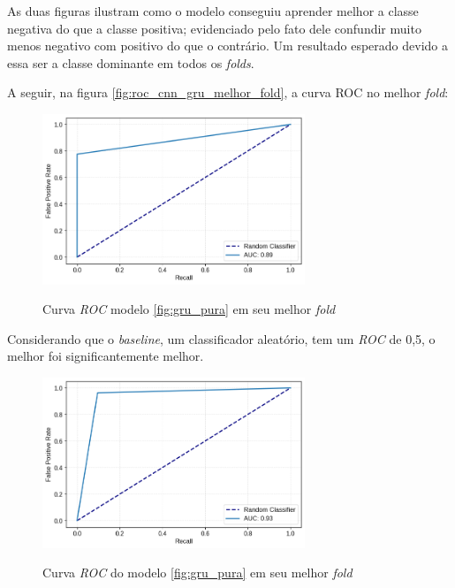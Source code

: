 As duas figuras ilustram como o modelo conseguiu aprender melhor a classe negativa do que a classe positiva; evidenciado pelo fato dele confundir
muito menos negativo com positivo do que o contrário. Um resultado esperado devido a essa ser a classe dominante em todos os \textit{folds}.

A seguir, na figura \ref{fig:roc_cnn_gru_melhor_fold}, a curva ROC no melhor \textit{fold}:

\begin{figure}[H]
  \centering
  \caption{Curva \textit{ROC} modelo \ref{fig:gru_pura} em seu melhor \textit{fold}}
   \includegraphics[width=0.7\textwidth]{figuras/modelos_resultados/gru/roc_gru_melhor_fold.png} %
  \label{fig:roc_melhor_fold_gru}
\end{figure}

Considerando que o \textit{baseline}, um classificador aleatório, tem um \textit{ROC} de 0,5, o melhor foi significantemente melhor.

\begin{figure}[H]
  \centering
  \caption{Curva \textit{ROC} do modelo \ref{fig:gru_pura} em seu melhor \textit{fold}}
   \includegraphics[width=0.7\textwidth]{figuras/modelos_resultados/gru/roc_gru_pior_fold.png} %
  \label{fig:roc_pior_fold_gru}
\end{figure}

